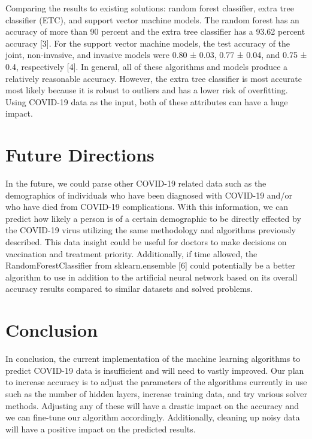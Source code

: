\documentclass[conference]{IEEEtran}
\begin{document}
Comparing the results to existing solutions: random forest classifier, extra tree classifier (ETC), and support vector machine models. The random forest has an accuracy of more than 90 percent and the extra tree classifier has a 93.62 percent accuracy [3]. For the support vector machine models, the test accuracy of the joint, non-invasive, and invasive models were 0.80 ± 0.03, 0.77 ± 0.04, and 0.75 ± 0.4, respectively [4]. In general, all of these algorithms and models produce a relatively reasonable accuracy. However, the extra tree classifier is most accurate most likely because it is robust to outliers and has a lower risk of overfitting. Using COVID-19 data as the input, both of these attributes can have a huge impact.

\section{Future Directions}
In the future, we could parse other COVID-19 related data such as the demographics of individuals who have been diagnosed with COVID-19 and/or who have died from COVID-19 complications. With this information, we can predict how likely a person is of a certain demographic to be directly effected by the COVID-19 virus utilizing the same methodology and algorithms previously described. This data insight could be useful for doctors to make decisions on vaccination and treatment priority. Additionally, if time allowed, the RandomForestClassifier from sklearn.ensemble [6] could potentially be a better algorithm to use in addition to the artificial neural network based on its overall accuracy results compared to similar datasets and solved problems. 

\section{Conclusion}
In conclusion, the current implementation of the machine learning algorithms to predict COVID-19 data is insufficient and will need to vastly improved. Our plan to increase accuracy is to adjust the parameters of the algorithms currently in use such as the number of hidden layers, increase training data, and try various solver methods. Adjusting any of these will have a drastic impact on the accuracy and we can fine-tune our algorithm accordingly. Additionally, cleaning up noisy data will have a positive impact on the predicted results.



\end{document}
